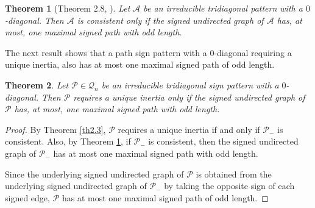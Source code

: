 \documentclass[10pt,a4paper]{amsart}
\newtheorem{theorem}{Theorem}[section]
\numberwithin{equation}{section}
\begin{document}
	
	\begin{theorem} [Theorem 2.8, \cite{1}] \label{th11}
		Let $\mathcal{A}$ be an irreducible tridiagonal pattern with a $0$-diagonal. 
		Then $\mathcal{A}$ is consistent only if the signed undirected graph of $\mathcal{A}$ has, at most, one 
		maximal signed path with odd length. 
	\end{theorem}
	
	The next result shows that a path sign pattern with a $0$-diagonal requiring a unique inertia, also has at most one maximal signed path of odd length.
	
	
	
	\begin{theorem}\label{th2.51}
		Let $\mathcal{P}\in \mathcal{Q}_n$ be an irreducible tridiagonal sign pattern with a $0$-diagonal. Then $\mathcal{P}$ requires a unique inertia only if the signed undirected graph of $\mathcal{P}$ has, at most, one maximal signed path with odd length.
	\end{theorem}
	\begin{proof}
		By Theorem \ref{th2.3}, $\mathcal{P}$ requires a unique inertia if and only if $\mathcal{P}_-$ is consistent. Also, by Theorem \ref{th11}, if $\mathcal{P}_-$ is consistent, then the signed undirected graph of $\mathcal{P}_-$ has at most one maximal signed path with odd length.
		
		Since the underlying signed undirected graph of $\mathcal{P}$ is obtained from the underlying signed undirected graph of $\mathcal{P}_-$ by taking the opposite sign of each signed edge, $\mathcal{P}$ has at most one maximal signed path of odd length. %
	\end{proof}
	
	
	
\end{document}
